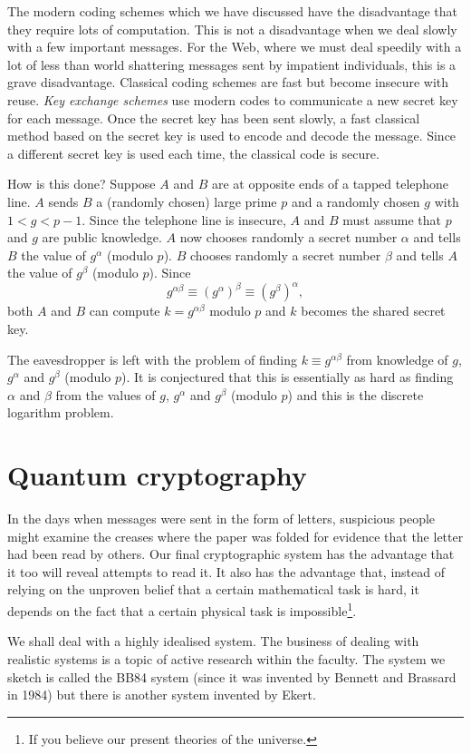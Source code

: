 \documentclass[12pt,a4paper]{article}
\theoremstyle{plain}
\theoremstyle{definition}
\begin{document}
The modern coding schemes which we have discussed
have the disadvantage that they require lots of computation.
This is not a disadvantage when we deal slowly
with a few important messages. For the Web, where
we must deal speedily with a lot of less than
world shattering messages sent by impatient
individuals, this is a grave disadvantage.
Classical coding schemes are fast but become
insecure with reuse. \emph{Key exchange schemes}
use modern codes to communicate a new
secret key for each message. Once the secret
key has been sent slowly, a fast classical
method based on the secret key is used to
encode and decode the message. Since a different
secret key is used each time, the classical code
is secure.

How is this done? Suppose $A$ and $B$ are at opposite
ends of a tapped telephone line. $A$ sends $B$
a (randomly chosen) large prime $p$ and a
randomly chosen $g$ with $1<g<p-1$. Since the
telephone line is insecure, $A$ and $B$ must
assume that $p$ and $g$ are public knowledge.
$A$ now chooses randomly a secret number $\alpha$ and
tells $B$ the value of $g^{\alpha}$ (modulo $p$). $B$
chooses randomly a secret number $\beta$ and
tells $A$ the value of $g^{\beta}$ (modulo $p$). Since
\[g^{\alpha\beta}\equiv(g^{\alpha})^{\beta}\equiv(g^{\beta})^{\alpha},\]
both $A$ and $B$ can compute $k=g^{\alpha\beta}$
modulo $p$ and $k$ becomes the shared secret key.

The eavesdropper is left with the problem of
finding $k\equiv g^{\alpha\beta}$ from knowledge
of $g$, $g^{\alpha}$ and $g^{\beta}$ (modulo $p$).
It is conjectured that this is essentially
as hard as finding $\alpha$ and $\beta$
from the values of $g$, $g^{\alpha}$ and $g^{\beta}$ (modulo $p$)
and this is the discrete logarithm problem.
\section{Quantum cryptography} 
In the days 
when messages were sent in the form of letters,
suspicious people might examine the creases 
where the paper was folded for evidence that
the letter had been read by others. Our final
cryptographic system has the advantage that it
too will reveal attempts to read it. It also
has the advantage that, instead of relying
on the unproven belief that a certain mathematical
task is hard, it depends on the fact that a certain
physical task is impossible\footnote{If you
believe our present theories of the universe.}.

We shall deal with a highly idealised system.
The business of dealing with realistic systems
is a topic of active research within the faculty.
The system we sketch is called the BB84 system
(since it was invented by Bennett and Brassard in 1984)
but there is another system invented by Ekert.
\end{document}
